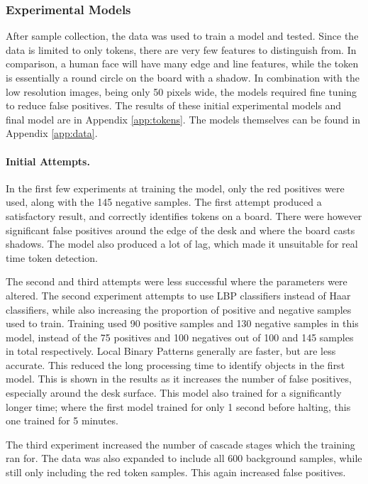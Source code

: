 \documentclass[12pt]{article}
\begin{document}
\subsubsection{Experimental Models}
After sample collection, the data was used to train a model and tested. 
Since the data is limited to only tokens, there are very few features to distinguish from. 
In comparison, a human face will have many edge and line features, while the token is essentially a round circle on the board with a shadow. In combination with the low resolution images, being only 50 pixels wide, the models required fine tuning to reduce false positives.  
The results of these initial experimental models and final model are in Appendix \ref{app:tokens}. The models themselves can be found in Appendix \ref{app:data}.

\paragraph{Initial Attempts.} In the first few experiments at training the model, only the red positives were used, along with the 145 negative samples. 
The first attempt produced a satisfactory result, and correctly identifies tokens on a board. 
There were however significant false positives around the edge of the desk and where the board casts shadows. The model also produced a lot of lag, which made it unsuitable for real time token detection. 

The second and third attempts were less successful where the parameters were altered.
The second experiment attempts to use LBP classifiers instead of Haar classifiers, while also increasing the proportion of positive and negative samples used to train. 
Training used 90 positive samples and 130 negative samples in this model, instead of the 75 positives and 100 negatives out of 100 and 145 samples in total respectively. 
Local Binary Patterns generally are faster, but are less accurate. 
This reduced the long processing time to identify objects in the first model.
This is shown in the results as it increases the number of false positives, especially around the desk surface. 
This model also trained for a significantly longer time; where the first model trained for only 1 second before halting, this one trained for 5 minutes. 

The third experiment increased the number of cascade stages which the training ran for. The data was also expanded to include all 600 background samples, while still only including the red token samples. 
This again increased false positives.
\end{document}
